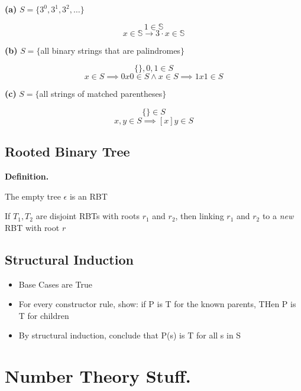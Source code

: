 \documentclass{article}
\begin{document}
\textbf{(a) } $S = \{3^0, 3^1, 3^2, \dots\}$

$$1 \in \mathbb{S}$$
$$x \in \mathbb{S} \rightarrow 3\cdot x \in \mathbb{S}$$

\textbf{(b) } $S = \{$all binary strings that are palindromes$\}$

$$\{\},0,1 \in S$$
$$x \in S \implies 0x0 \in S \wedge x \in S \implies 1x1 \in S$$

\textbf{(c) } $S = \{$all strings of matched parentheses$\}$ 

$$\{\} \in S$$ $$x,y \in S \implies [x]y \in S$$

\subsection*{Rooted Binary Tree}

\textbf{Definition.}

The empty tree $\epsilon$ is an RBT

If $T_1, T_2$ are disjoint RBTs with roots $r_1$ and $r_2$, then linking $r_1$ and $r_2$ to a \textit{new} RBT with root $r$

\subsection*{Structural Induction}

\begin{itemize}
  \item Base Cases are True
  \item For every constructor rule, show: if P is T for the known parents, THen P is T for children
  \item By structural induction, conclude that P(s) is T for all s in S
\end{itemize}

































\newpage

\section*{Number Theory Stuff.}
\end{document}
